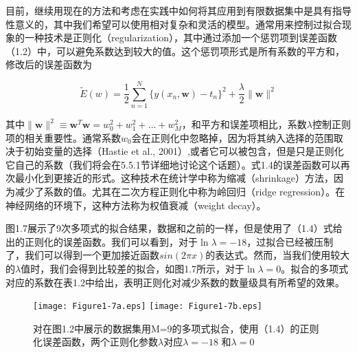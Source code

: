 	目前，继续用现在的方法和考虑在实践中如何将其应用到有限数据集中是具有指导性意义的，其中我们希望可以使用相对复杂和灵活的模型。通常用来控制过拟合现象的一种技术是正则化（regularization），其中通过添加一个惩罚项到误差函数（1.2）中，可以避免系数达到较大的值。这个惩罚项形式是所有系数的平方和，修改后的误差函数为
	
	\begin{equation}
	\tilde{E}(w) = \frac{1}{2} \sum_{n = 1}^{N}\{ y(x_n,\mathbf{w}) - t_n\}^2 + \frac{\lambda}{2} \parallel \mathbf{w} \parallel^2
	\end{equation}
	
	其中$\parallel \mathbf{w} \parallel^2 \equiv \mathbf{w}^T\mathbf{w} = w_0^2 + w_1^2 + \dots +w_M^2 $，和平方和误差项相比，系数$\lambda$控制正则项的相关重要性。通常系数$w_0$会在正则化中忽略掉，因为将其纳入选择的范围取决于初始变量的选择（Hastie et al., 2001）,或者它可以被包含，但是只是正则化它自己的系数（我们将会在5.5.1节详细地讨论这个话题）。式1.4的误差函数可以再次最小化到更接近的形式。这种技术在统计学中称为缩减（shrinkage）方法，因为减少了系数的值。尤其在二次方程正则化中称为岭回归（ridge regression）。在神经网络的环境下，这种方法称为权值衰减（weight decay）。
	
	图1.7展示了9次多项式的拟合结果，数据和之前的一样，但是使用了（1.4）式给出的正则化的误差函数。我们可以看到，对于$\ln \lambda = -18$，过拟合已经被压制了，我们可以得到一个更加接近函数$sin(2 \pi x)$的表达式。然而，当我们使用较大的$\lambda$值时，我们会得到比较差的拟合，如图1.7所示，对于$\ln \lambda = 0$。拟合的多项式对应的系数在表1.2中给出，表明正则化对减少系数的数量级具有所希望的效果。
	
	\begin{figure}
		
		\texttt{[image: Figure1-7a.eps]}
		\texttt{[image: Figure1-7b.eps]}
		
		\caption{对在图1.2中展示的数据集用M=9的多项式拟合，使用（1.4）的正则化误差函数，两个正则化参数$\lambda$对应$\lambda = -18$ 和$\lambda = 0$} 
		\label{fig:endb-flow} 
	\end{figure}
	
